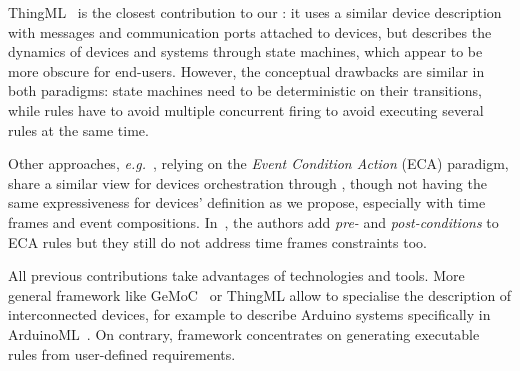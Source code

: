 ThingML~\cite{harrand-16} is the closest contribution to our \DSL: it uses a similar device description with messages and communication ports attached to devices, but describes the dynamics of devices and systems through state machines, which appear to be more obscure for end-users. However, the conceptual drawbacks are similar in both paradigms: state machines need to be deterministic on their transitions, while rules have to avoid multiple concurrent firing to avoid executing several rules at the same time. 

Other approaches, \textit{e.g.}~\cite{bhandari-13,cheng-16}, relying on the \textit{Event Condition Action} (ECA) paradigm, share a similar view for \IOT devices orchestration through \CEP, though not having the same expressiveness for devices' definition as we propose, especially with time frames and event compositions. In~\cite{shimokura-07}, the authors add \textit{pre-} and \textit{post-conditions} to ECA rules but they still do not address time frames constraints too.

All previous contributions take advantages of \MDE technologies and tools. More general \MDE framework like GeMoC~\cite{bousse-16} or ThingML allow to specialise the description of interconnected devices, for example to describe Arduino systems specifically in ArduinoML~\cite{mosser-14}. On contrary, \IOTDSL framework concentrates on generating executable rules from user-defined requirements.
